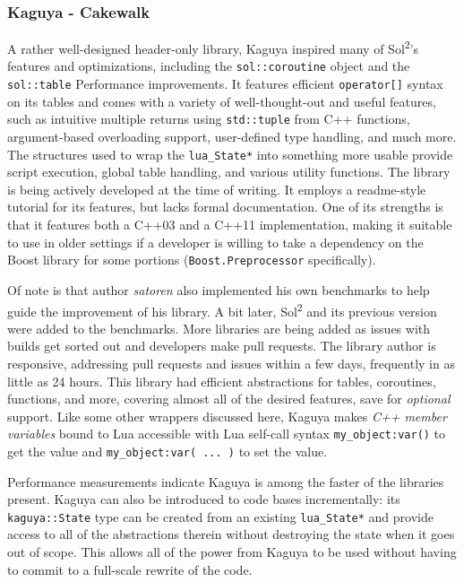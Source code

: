 \documentclass[conference,compsoc]{IEEEtran}
\newcommand{\soltwo}{Sol\textsuperscript{2}}
\begin{document}
\subsubsection{Kaguya - Cakewalk}

A rather well-designed header-only library, Kaguya\cite{kaguya} inspired many of \soltwo{}'s features and optimizations, including the \lstinline|sol::coroutine| object and the \lstinline|sol::table| Performance improvements. It features efficient \lstinline|operator[]| syntax on its tables and comes with a variety of well-thought-out and useful features, such as intuitive multiple returns using \lstinline|std::tuple| from C++ functions, argument-based overloading support, user-defined type handling, and much more. The structures used to wrap the \lstinline|lua_State*| into something more usable provide script execution, global table handling, and various utility functions. The library is being actively developed at the time of writing. It employs a readme-style tutorial for its features, but lacks formal documentation. One of its strengths is that it features both a C++03 and a C++11 implementation, making it suitable to use in older settings if a developer is willing to take a dependency on the Boost\cite{boost} library for some portions (\lstinline|Boost.Preprocessor| specifically).

Of note is that author \emph{satoren} also implemented his own benchmarks\cite{satoren-bench} to help guide the improvement of his library. A bit later, \soltwo{} and its previous version were added to the benchmarks. More libraries are being added as issues with builds get sorted out and developers make pull requests. The library author is responsive, addressing pull requests and issues within a few days, frequently in as little as 24 hours. This library had efficient abstractions for tables, coroutines, functions, and more, covering almost all of the desired features, save for \emph{optional} support. Like some other wrappers discussed here, Kaguya makes \emph{C++ member variables} bound to Lua accessible with Lua self-call syntax \lstinline|my_object:var()| to get the value and \lstinline|my_object:var( ... )| to set the value.

Performance measurements indicate Kaguya is among the faster of the libraries present. Kaguya can also be introduced to code bases incrementally: its \lstinline|kaguya::State| type can be created from an existing \lstinline|lua_State*| and provide access to all of the abstractions therein without destroying the state when it goes out of scope. This allows all of the power from Kaguya to be used without having to commit to a full-scale rewrite of the code.
\end{document}
